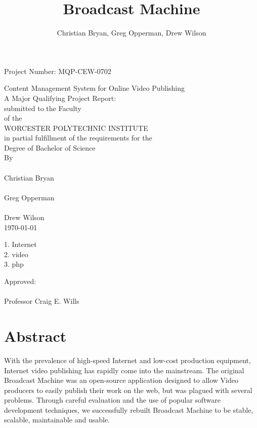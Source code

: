 \documentclass[a4paper,12pt]{report}
\title{Broadcast Machine}
\author{Christian Bryan, Greg Opperman, Drew Wilson}
\begin{document}
\begin{titlepage}
  \topmargin 0.5in
  \headheight 0in
\begin{center}
  \begin{flushright}
Project Number: MQP-CEW-0702\\
\end{flushright}
\vspace*{40mm}
Content Management System for Online Video Publishing\\
A Major Qualifying Project Report:\\
submitted to the Faculty\\
of the\\
WORCESTER POLYTECHNIC INSTITUTE\\
in partial fulfillment of the requirements for the\\
Degree of Bachelor of Science\\
By\\
\makebox[2in]{\hrulefill}\\
Christian Bryan\\
\vspace*{10mm}
\makebox[2in]{\hrulefill}\\
Greg Opperman\\
\vspace*{10mm}
\makebox[2in]{\hrulefill}\\
Drew Wilson\\
\vspace*{10mm}
\today\\
\vspace*{10mm}
\begin{flushleft}
  1. Internet\\
  2. video\\
  3. php\\
\end{flushleft}
\begin{flushright}
Approved:\\
\vspace*{10mm}
\makebox[2in]{\hrulefill}\\
Professor Craig E. Wills\\
\end{flushright}
\end{center}
\end{titlepage}

\chapter*{Abstract}
With the prevalence of high-speed Internet and low-cost production equipment, Internet video publishing has rapidly come into the 
mainstream.
The original Broadcast Machine was an open-source application designed to allow Video producers to easily publish their work on the web, but was plagued with several problems.
Through careful evaluation and the use of popular software development techniques, we successfully rebuilt Broadcast Machine to be stable, scalable, maintainable and usable.
\end{document}
